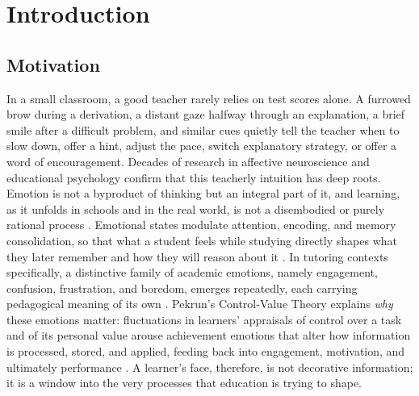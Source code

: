 \chapter{Introduction}\label{chap:intro}

\section{Motivation}\label{sec:motivation}

In a small classroom, a good teacher rarely relies on test scores alone. A furrowed brow during a derivation, a distant gaze halfway through an explanation, a brief smile after a difficult problem, and similar cues quietly tell the teacher when to slow down, offer a hint, adjust the pace, switch explanatory strategy, or offer a word of encouragement. Decades of research in affective neuroscience and educational psychology confirm that this teacherly intuition has deep roots. Emotion is not a byproduct of thinking but an integral part of it, and learning, as it unfolds in schools and in the real world, is not a disembodied or purely rational process \cite{immordino-yang_we_2007}. Emotional states modulate attention, encoding, and memory consolidation, so that what a student feels while studying directly shapes what they later remember and how they will reason about it \cite{tyng_influences_2017}. In tutoring contexts specifically, a distinctive family of academic emotions, namely engagement, confusion, frustration, and boredom, emerges repeatedly, each carrying pedagogical meaning of its own \cite{dmello_language_2012}. Pekrun's Control-Value Theory explains \emph{why} these emotions matter: fluctuations in learners' appraisals of control over a task and of its personal value arouse achievement emotions that alter how information is processed, stored, and applied, feeding back into engagement, motivation, and ultimately performance \cite{pekrun_control-value_2006}. A learner's face, therefore, is not decorative information; it is a window into the very processes that education is trying to shape.


